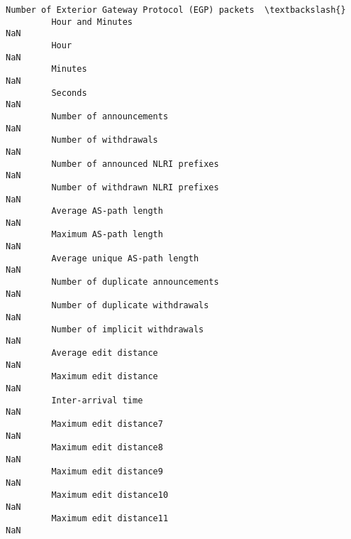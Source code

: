 \documentclass[11pt]{article}
\begin{document}
\begin{Verbatim}[commandchars=\\\{\}]
                                                            Number of Exterior Gateway Protocol (EGP) packets  \textbackslash{}
         Hour and Minutes                                                                                 NaN   
         Hour                                                                                             NaN   
         Minutes                                                                                          NaN   
         Seconds                                                                                          NaN   
         Number of announcements                                                                          NaN   
         Number of withdrawals                                                                            NaN   
         Number of announced NLRI prefixes                                                                NaN   
         Number of withdrawn NLRI prefixes                                                                NaN   
         Average AS-path length                                                                           NaN   
         Maximum AS-path length                                                                           NaN   
         Average unique AS-path length                                                                    NaN   
         Number of duplicate announcements                                                                NaN   
         Number of duplicate withdrawals                                                                  NaN   
         Number of implicit withdrawals                                                                   NaN   
         Average edit distance                                                                            NaN   
         Maximum edit distance                                                                            NaN   
         Inter-arrival time                                                                               NaN   
         Maximum edit distance7                                                                           NaN   
         Maximum edit distance8                                                                           NaN   
         Maximum edit distance9                                                                           NaN   
         Maximum edit distance10                                                                          NaN   
         Maximum edit distance11                                                                          NaN   

\end{Verbatim}
\end{document}

